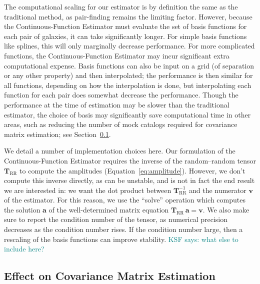 \documentclass[modern]{aastex62}
\newcommand{\est}{the Continuous-Function Estimator\xspace}
\newcommand{\inv}{^{-1}}
\newcommand{\bld}[1]{\bm{#1}} %
\newcommand{\vv}[1]{\bld{v}_\mathrm{#1}}
\newcommand{\TT}[1]{\bld{T}_\mathrm{#1}}
\newcommand{\KSF}[1]{\textcolor{teal}{KSF says: #1}}
\begin{document}
The computational scaling for our estimator is by definition the same as the traditional method, as pair-finding remains the limiting factor.
However, because \est must evaluate the set of basis functions for each pair of galaxies, it can take significantly longer.
For simple basis functions like splines, this will only marginally decrease performance.
For more complicated functions, \est may incur significant extra computational expense.
Basis functions can also be input on a grid (of separation or any other property) and then interpolated; the performance is then similar for all functions, depending on how the interpolation is done, but interpolating each function for each pair does somewhat decrease the performance.
Though the performance at the time of estimation may be slower than the traditional estimator, the choice of basis may significantly save computational time in other areas, such as reducing the number of mock catalogs required for covariance matrix estimation; see Section~\ref{sec:covariance}.

We detail a number of implementation choices here.
Our formulation of \est requires the inverse of the random--random tensor $\TT{RR}$ to compute the amplitudes (Equation~\ref{eq:amplitude}).
However, we don't compute this inverse directly, as can be unstable, and is not in fact the end result we are interested in: we want the dot product between $\TT{RR}\inv$ and the numerator $\vv{}$ of the estimator.
For this reason, we use the ``solve'' operation which computes the solution $\bld{a}$ of the well-determined matrix equation $\TT{RR}\,\bld{a}=\bld{v}$.
We also make sure to report the condition number of the tensor, as numerical precision decreases as the condition number rises.
If the condition number large, then a rescaling of the basis functions can improve stability.
\KSF{what else to include here?}

\subsection{Effect on Covariance Matrix Estimation}
\label{sec:covariance}
\end{document}

